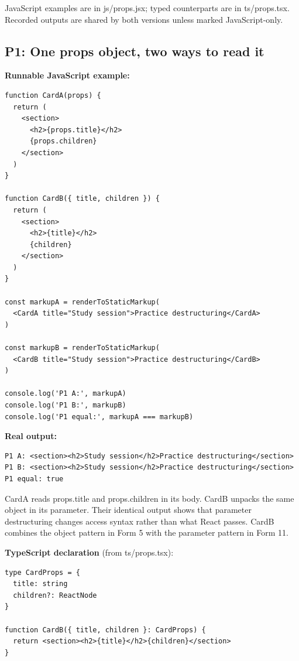 \documentclass[10pt,a4paper]{article}
\begin{document}
JavaScript examples are in js/props.jsx; typed counterparts are in ts/props.tsx. Recorded outputs are shared by both versions unless marked JavaScript-only.

\subsection{P1: One props object, two ways to read it}

\textbf{Runnable JavaScript example:}

\begin{lstlisting}[language=GuideJS]
function CardA(props) {
  return (
    <section>
      <h2>{props.title}</h2>
      {props.children}
    </section>
  )
}

function CardB({ title, children }) {
  return (
    <section>
      <h2>{title}</h2>
      {children}
    </section>
  )
}

const markupA = renderToStaticMarkup(
  <CardA title="Study session">Practice destructuring</CardA>
)

const markupB = renderToStaticMarkup(
  <CardB title="Study session">Practice destructuring</CardB>
)

console.log('P1 A:', markupA)
console.log('P1 B:', markupB)
console.log('P1 equal:', markupA === markupB)
\end{lstlisting}


\textbf{Real output:}

\begin{lstlisting}[language={}]
P1 A: <section><h2>Study session</h2>Practice destructuring</section>
P1 B: <section><h2>Study session</h2>Practice destructuring</section>
P1 equal: true
\end{lstlisting}

CardA reads props.title and props.children in its body. CardB unpacks the same object in its parameter. Their identical output shows that parameter destructuring changes access syntax rather than what React passes. CardB combines the object pattern in Form 5 with the parameter pattern in Form 11.


\textbf{TypeScript declaration} (from ts/props.tsx):

\begin{lstlisting}[language=GuideJS]
type CardProps = {
  title: string
  children?: ReactNode
}

function CardB({ title, children }: CardProps) {
  return <section><h2>{title}</h2>{children}</section>
}
\end{lstlisting}
\end{document}
